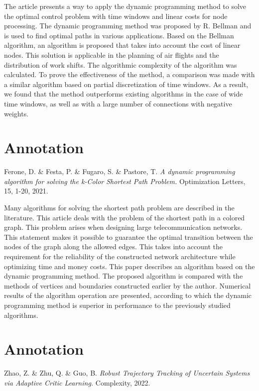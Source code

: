 \documentclass[14pt]{extarticle}
\begin{document}
The article presents a way to apply the dynamic programming method to solve the optimal control problem with time windows and linear costs for node processing.
The dynamic programming method was proposed by R. Bellman and is used to find optimal paths in various applications.
Based on the Bellman algorithm, an algorithm is proposed that takes into account the cost of linear nodes.
This solution is applicable in the planning of air flights and the distribution of work shifts.
The algorithmic complexity of the algorithm was calculated.
To prove the effectiveness of the method, a comparison was made with a similar algorithm based on partial discretization of time windows.
As a result, we found that the method outperforms existing algorithms in the case of wide time windows, as well as with a large number of connections with negative weights.

\section{Annotation}
Ferone, D. \& Festa, P. \& Fugaro, S. \& Pastore, T. \textit{A dynamic programming algorithm for solving the k-Color Shortest Path Problem.} Optimization Letters, 15, 1-20, 2021.

Many algorithms for solving the shortest path problem are described in the literature.
This article deals with the problem of the shortest path in a colored graph.
This problem arises when designing large telecommunication networks.
This statement makes it possible to guarantee the optimal transition between the nodes of the graph along the allowed edges.
This takes into account the requirement for the reliability of the constructed network architecture while optimizing time and money costs.
This paper describes an algorithm based on the dynamic programming method.
The proposed algorithm is compared with the methods of vertices and boundaries constructed earlier by the author.
Numerical results of the algorithm operation are presented, according to which the dynamic programming method is superior in performance to the previously studied algorithms.

\section{Annotation}
Zhao, Z. \& Zhu, Q. \& Guo, B. \textit{Robust Trajectory Tracking of Uncertain Systems via Adaptive Critic Learning.} Complexity, 2022.
\end{document}
